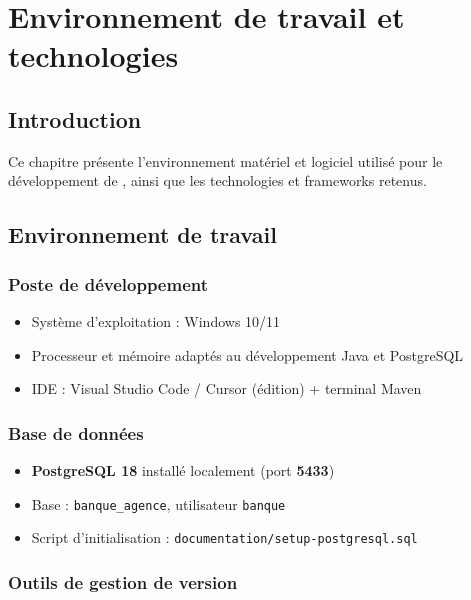 \chapter{Environnement de travail et technologies}
\label{ch:techno}

\section{Introduction}

Ce chapitre présente l'environnement matériel et logiciel utilisé pour le développement de \nomapplication, ainsi que les technologies et frameworks retenus.

\section{Environnement de travail}

\subsection{Poste de développement}

\begin{itemize}[leftmargin=*]
    \item Système d'exploitation : Windows 10/11
    \item Processeur et mémoire adaptés au développement Java et PostgreSQL
    \item IDE : Visual Studio Code / Cursor (édition) + terminal Maven
\end{itemize}

\subsection{Base de données}

\begin{itemize}[leftmargin=*]
    \item \textbf{PostgreSQL 18} installé localement (port \textbf{5433})
    \item Base : \texttt{banque\_agence}, utilisateur \texttt{banque}
    \item Script d'initialisation : \texttt{documentation/setup-postgresql.sql}
\end{itemize}

\subsection{Outils de gestion de version}

